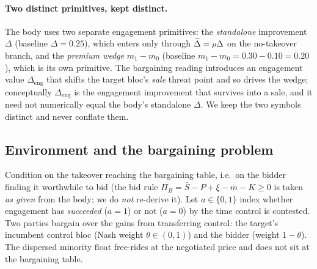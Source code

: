 \paragraph{Two distinct primitives, kept distinct.}
The body uses two separate engagement primitives: the \emph{standalone}
improvement $\Delta$ (baseline $\Delta=0.25$), which enters only through
$\widetilde{\Delta}=\rho\Delta$ on the no-takeover branch, and the \emph{premium wedge}
$m_{1}-m_{0}$ (baseline $m_{1}-m_{0}=0.30-0.10=0.20$), which is its own
primitive. The bargaining reading introduces an engagement value
$\Delta_{\mathrm{eng}}$ that shifts the target bloc's \emph{sale} threat point
and so drives the wedge; conceptually $\Delta_{\mathrm{eng}}$ is the engagement
improvement that survives into a sale, and it need not numerically equal the
body's standalone $\Delta$. We keep the two symbols distinct and never conflate
them.

\subsection{Environment and the bargaining problem}
\label{app:bg-env}

Condition on the takeover reaching the bargaining table, i.e.\ on the bidder
finding it worthwhile to bid (the bid rule
$\Pi_{B}=\bar S-P+\xi-\bar m-K\ge 0$ is taken \emph{as given} from the body; we
do \emph{not} re-derive it). Let $a\in\{0,1\}$ index whether engagement has
\emph{succeeded} ($a=1$) or not ($a=0$) by the time control is contested. Two
parties bargain over the gains from transferring control: the target's incumbent
control bloc (Nash weight $\theta\in(0,1)$) and the bidder (weight $1-\theta$).
The dispersed minority float free-rides at the negotiated price and does not sit
at the bargaining table.

